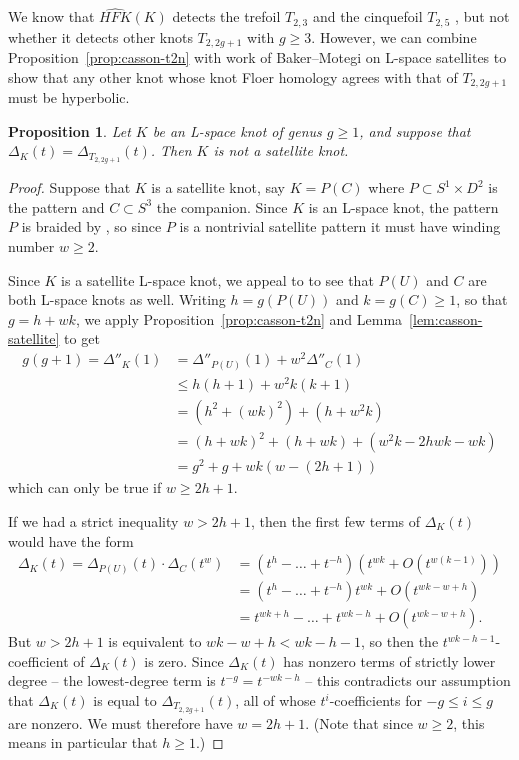 \documentclass[11pt]{amsart}
\newtheorem {proposition}[theorem]{Proposition}
\numberwithin{equation}{section}
\numberwithin{theorem}{section}
\theoremstyle{definition}
\newcommand\hfk{\mathit{HFK}}
\newcommand\hfkhat{\widehat{\hfk}}
\begin{document}
We know that $\hfkhat(K)$ detects the trefoil $T_{2,3}$ \cite{ghiggini} and the cinquefoil $T_{2,5}$ \cite{frw-cinquefoil}, but not whether it detects other knots $T_{2,2g+1}$ with $g \geq 3$.  However, we can combine Proposition~\ref{prop:casson-t2n} with work of Baker--Motegi \cite{baker-motegi-twist} on L-space satellites to show that any other knot whose knot Floer homology agrees with that of $T_{2,2g+1}$ must be hyperbolic.

\begin{proposition} \label{prop:satellite-t2n}
Let $K$ be an L-space knot of genus $g \geq 1$, and suppose that $\Delta_K(t) = \Delta_{T_{2,2g+1}}(t)$.  Then $K$ is not a satellite knot.
\end{proposition}

\begin{proof}
Suppose that $K$ is a satellite knot, say $K=P(C)$ where $P \subset S^1\times D^2$ is the pattern and $C \subset S^3$ the companion.  Since $K$ is an L-space knot, the pattern $P$ is braided by \cite[Theorem~1.17]{baker-motegi-twist}, so since $P$ is a nontrivial satellite pattern it must have winding number $w \geq 2$.

Since $K$ is a satellite L-space knot, we appeal to \cite[Theorem~1.15]{hrw} to see that $P(U)$ and $C$ are both L-space knots as well.  Writing $h=g(P(U))$ and $k = g(C) \geq 1$, so that $g = h+wk$, we apply Proposition~\ref{prop:casson-t2n} and Lemma~\ref{lem:casson-satellite} to get
\begin{align*}
g(g+1) = \Delta''_K(1) &= \Delta''_{P(U)}(1) + w^2 \Delta''_C(1) \\
&\leq h(h+1) + w^2k(k+1) \\
&= (h^2 + (wk)^2) + (h+w^2k) \\
&= (h+wk)^2 + (h+wk) + (w^2k - 2hwk - wk) \\
&= g^2+g + wk(w-(2h+1))
\end{align*}
which can only be true if $w \geq 2h+1$.

If we had a strict inequality $w > 2h+1$, then the first few terms of $\Delta_K(t)$ would have the form
\begin{align*}
\Delta_K(t) = \Delta_{P(U)}(t) \cdot \Delta_C(t^w) &= (t^h - \dots + t^{-h}) (t^{wk} + O(t^{w(k-1)})) \\
&= (t^h - \dots + t^{-h})t^{wk} + O(t^{wk-w+h}) \\
&= t^{wk+h} - \dots + t^{wk-h} + O(t^{wk-w+h}).
\end{align*}
But $w > 2h+1$ is equivalent to $wk-w+h < wk-h-1$, so then the $t^{wk-h-1}$-coefficient of $\Delta_K(t)$ is zero.  Since $\Delta_K(t)$ has nonzero terms of strictly lower degree -- the lowest-degree term is $t^{-g} = t^{-wk-h}$ -- this contradicts our assumption that $\Delta_K(t)$ is equal to $\Delta_{T_{2,2g+1}}(t)$, all of whose $t^i$-coefficients for $-g \leq i \leq g$ are nonzero.  We must therefore have $w=2h+1$.  (Note that since $w \geq 2$, this means in particular that $h \geq 1$.)


\end{proof}
\end{document}

